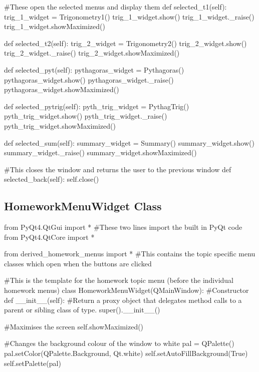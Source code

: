 \begin{landscape}
\begin{python}
    #These open the selected menus and display them
    def selected_t1(self):
        trig_1_widget = Trigonometry1()
        trig_1_widget.show()
        trig_1_widget._raise()
        trig_1_widget.showMaximized()

    def selected_t2(self):
        trig_2_widget = Trigonometry2()
        trig_2_widget.show()
        trig_2_widget._raise()
        trig_2_widget.showMaximized()

    def selected_pyt(self):
        pythagoras_widget = Pythagoras()
        pythagoras_widget.show()
        pythagoras_widget._raise()
        pythagoras_widget.showMaximized()

    def selected_pytrig(self):
        pyth_trig_widget = PythagTrig()
        pyth_trig_widget.show()
        pyth_trig_widget._raise()
        pyth_trig_widget.showMaximized()

    def selected_sum(self):
        summary_widget = Summary()
        summary_widget.show()
        summary_widget._raise()
        summary_widget.showMaximized()

    #This closes the window and returns the user to the previous window
    def selected_back(self):
        self.close()
\end{python}

\subsection{HomeworkMenuWidget Class}

\begin{python}
from PyQt4.QtGui import * #These two lines import the built in PyQt code
from PyQt4.QtCore import *

from derived_homework_menus import * #This contains the topic specific menu classes which open when the buttons are clicked

#This is the template for the homework topic menu (before the individual homework menus)
class HomeworkMenuWidget(QMainWindow):
    #Constructor
    def __init__(self):
        #Return a proxy object that delegates method calls to a parent or sibling class of type.
        super().__init__()

        #Maximises the screen
        self.showMaximized()

        #Changes the background colour of the window to white
        pal = QPalette()
        pal.setColor(QPalette.Background, Qt.white)
        self.setAutoFillBackground(True)
        self.setPalette(pal)


\end{python}
\end{landscape}
